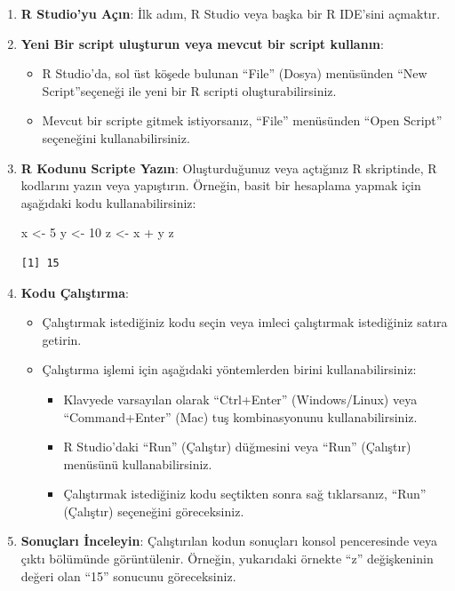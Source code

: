 \documentclass[
  letterpaper,
  DIV=11,
  numbers=noendperiod]{scrreprt}
\newenvironment{Shaded}{\begin{snugshade}}{\end{snugshade}}
\newcommand{\DecValTok}[1]{\textcolor[rgb]{0.68,0.00,0.00}{#1}}
\newcommand{\NormalTok}[1]{\textcolor[rgb]{0.00,0.23,0.31}{#1}}
\newcommand{\OtherTok}[1]{\textcolor[rgb]{0.00,0.23,0.31}{#1}}
\newcommand{\SpecialCharTok}[1]{\textcolor[rgb]{0.37,0.37,0.37}{#1}}
\begin{document}
\begin{enumerate}
\def\labelenumi{\arabic{enumi}.}
\item
  \textbf{R Studio'yu Açın}: İlk adım, R Studio veya başka bir R
  IDE'sini açmaktır.
\item
  \textbf{Yeni Bir script uluşturun veya mevcut bir script kullanın}:

  \begin{itemize}
  \item
    R Studio'da, sol üst köşede bulunan ``File'' (Dosya) menüsünden
    ``New Script''seçeneği ile yeni bir R scripti oluşturabilirsiniz.
  \item
    Mevcut bir scripte gitmek istiyorsanız, ``File'' menüsünden ``Open
    Script'' seçeneğini kullanabilirsiniz.
  \end{itemize}
\item
  \textbf{R Kodunu Scripte Yazın}: Oluşturduğunuz veya açtığınız R
  skriptinde, R kodlarını yazın veya yapıştırın. Örneğin, basit bir
  hesaplama yapmak için aşağıdaki kodu kullanabilirsiniz:

\begin{Shaded}
\begin{Highlighting}[]
\NormalTok{x }\OtherTok{\textless{}{-}} \DecValTok{5}
\NormalTok{y }\OtherTok{\textless{}{-}} \DecValTok{10}
\NormalTok{z }\OtherTok{\textless{}{-}}\NormalTok{ x }\SpecialCharTok{+}\NormalTok{ y}
\NormalTok{z}
\end{Highlighting}
\end{Shaded}

\begin{verbatim}
[1] 15
\end{verbatim}
\item
  \textbf{Kodu Çalıştırma}:

  \begin{itemize}
  \item
    Çalıştırmak istediğiniz kodu seçin veya imleci çalıştırmak
    istediğiniz satıra getirin.
  \item
    Çalıştırma işlemi için aşağıdaki yöntemlerden birini
    kullanabilirsiniz:

    \begin{itemize}
    \item
      Klavyede varsayılan olarak ``Ctrl+Enter'' (Windows/Linux) veya
      ``Command+Enter'' (Mac) tuş kombinasyonunu kullanabilirsiniz.
    \item
      R Studio'daki ``Run'' (Çalıştır) düğmesini veya ``Run'' (Çalıştır)
      menüsünü kullanabilirsiniz.
    \item
      Çalıştırmak istediğiniz kodu seçtikten sonra sağ tıklarsanız,
      ``Run'' (Çalıştır) seçeneğini göreceksiniz.
    \end{itemize}
  \end{itemize}
\item
  \textbf{Sonuçları İnceleyin}: Çalıştırılan kodun sonuçları konsol
  penceresinde veya çıktı bölümünde görüntülenir. Örneğin, yukarıdaki
  örnekte ``z'' değişkeninin değeri olan ``15'' sonucunu göreceksiniz.
\end{enumerate}
\end{document}
